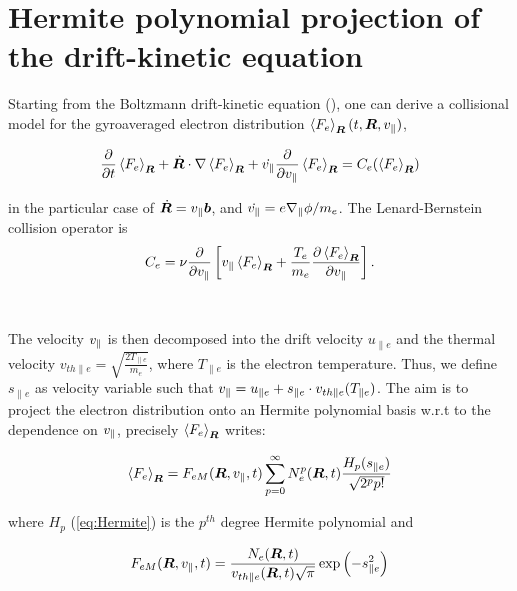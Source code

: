 \documentclass[final]{jpp}
\begin{document}
\section{Hermite polynomial projection of the drift-kinetic equation}

Starting from the Boltzmann drift-kinetic equation (\cite{Jorge2017}), one can derive a collisional model for the gyroaveraged electron distribution $\left< F_e \right>_{\bm{R}}(t, \bm{R}, v_{\parallel})$,

\begin{equation} \label{eq:drift-kinetic}
\frac{\partial}{\partial t} \left< F_e \right>_{\bm{R}} + \dot {\bm{R}}\cdot \nabla \left< F_e \right>_{\bm{R}} + \dot {v_{\parallel}} \frac{\partial }{ \partial v_{\parallel}} \left< F_e \right>_{\bm{R}} = C_e(\left< F_e \right>_{\bm{R}})
\end{equation}

in the particular case of $\dot {\bm{R}} = v_\parallel \bm{b}$, and $\dot {v_{\parallel}} = e \nabla_\parallel \phi/m_e$.
The Lenard-Bernstein collision operator is 
\begin{equation} \label{eq:LenardBernstein}
    C_e = \nu \frac{\partial }{\partial v_\parallel}\left[v_\parallel \left< F_e \right>_{\bm{R}} + \frac{T_e}{m_e} \frac{\partial \left< F_e \right>_{\bm{R}}}{\partial v_\parallel} \right].
\end{equation}
\\
\\
The velocity $v_{\parallel}$ is then decomposed into the drift velocity $u_{\parallel e}$ and the thermal velocity $v_{th \parallel e} = \sqrt{\frac{2 T_{\parallel e}}{m_e}}$, where $T_{\parallel e}$ is the electron temperature. Thus, we define $s_{\parallel e}$ as velocity variable such that 
$v_{\parallel} = u_{\parallel e} + s_{\parallel e} \cdot v_{th \parallel e}(T_{\parallel e})$. 
The aim is to project the electron distribution onto an Hermite polynomial basis w.r.t to the dependence on $v_{\parallel}$, precisely $\left< F_e \right>_{\bm{R}}$ writes:

\begin{equation} \label{eq:projection}
\left< F_e \right>_{\bm{R}} = F_{eM}(\bm{R},v_{\parallel},t) \sum_{p=0}^{\infty} N_e^p(\bm{R},t) \frac{H_p(s_{\parallel e})}{\sqrt{2^p p!}}
\end{equation}

where $H_p$ (\ref{eq:Hermite}) is the $p^{th}$ degree Hermite polynomial and

\begin{equation}
F_{eM}(\bm{R},v_{\parallel},t)=\frac{N_e(\bm{R},t)}{v_{th\parallel e}(\bm{R},t)\sqrt{\pi}}\exp\left(-s_{\parallel e}^2\right)    
\end{equation}
\end{document}

